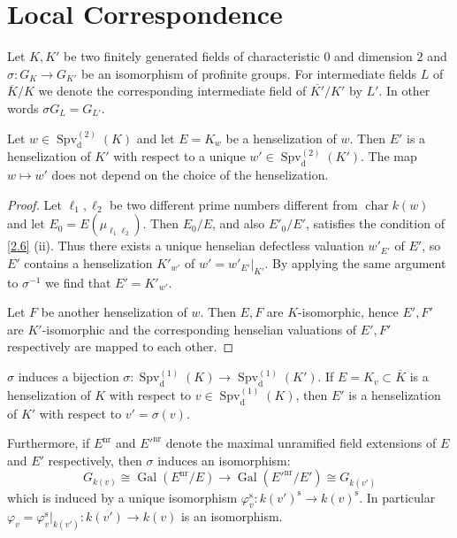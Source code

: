 \section{Local Correspondence}

Let $K,K'$ be two finitely generated fields of characteristic $0$ and dimension $2$ and $\sigma:G_K\to G_{K'}$ be an isomorphism of profinite groups. For intermediate fields $L$ of $\overline{K}/K$ we denote the corresponding intermediate field of $\overline{K'}/K'$ by $L'$. In other words $\sigma G_L=G_{L'}$.

\begin{lemma}\label{3.1}
Let $w\in\operatorname{Spv}_\text{d}^{(2)}(K)$ and let $E=K_w$ be a henselization of $w$. Then $E'$ is a henselization of $K'$ with respect to a unique $w'\in\operatorname{Spv}_\text{d}^{(2)}(K')$. The map $w\mapsto w'$ does not depend on the choice of the henselization.
\end{lemma}

\begin{proof}
Let $\ell_1,\ell_2$ be two different prime numbers different from $\operatorname{char} k(w)$ and let $E_0 = E(\mu_{\ell_1\ell_2})$. Then $E_0/E$, and also $E'_0/E'$, satisfies the condition of \ref{2.6} (ii). Thus there exists a unique henselian defectless valuation $w'_{E'}$ of $E'$, so $E'$ contains a henselization $K'_{w'}$ of $w' = w'_{E'}|_{K'}$. By applying the same argument to $\sigma^{-1}$ we find that $E' = K'_{w'}$.

Let $F$ be another henselization of $w$. Then $E, F$ are $K$-isomorphic, hence $E',F'$ are $K'$-isomorphic and the corresponding henselian valuations of $E', F'$ respectively are mapped to each other.
\end{proof}

\begin{lemma}\label{3.2}
$\sigma$ induces a bijection $\sigma:\operatorname{Spv}_\text{d}^{(1)}(K) \to\operatorname{Spv}_\text{d}^{(1)}(K')$. If $E=K_v\subset\overline{K}$ is a henselization of $K$ with respect to $v\in\operatorname{Spv}_\text{d}^{(1)}(K)$, then $E'$ is a henselization of $K'$ with respect to $v'=\sigma(v)$. 

Furthermore, if $E^{\text{nr}}$ and $E'^{\text{nr}}$ denote the maximal unramified field extensions of $E$ and $E'$ respectively, then $\sigma$ induces an isomorphism:
\[ G_{k(v)}\cong\operatorname{Gal}(E^\text{nr}/E) \to\operatorname{Gal}(E'^{\text{nr}}/E')\cong G_{k(v')} \]
which is induced by a unique isomorphism $\varphi_v^\text{s}:k(v')^\text{s}\to k(v)^\text{s}$. In particular $\varphi_v=\varphi_v^\text{s}|_{k(v')}:k(v')\to k(v)$ is an isomorphism.
\end{lemma}

